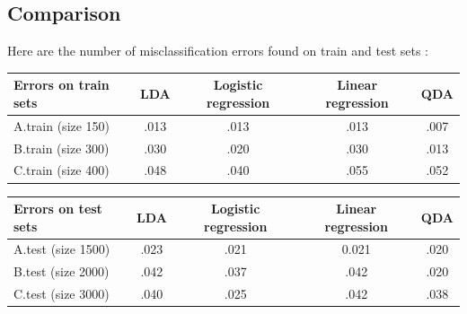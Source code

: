 \documentclass[11pt,a4paper]{article}
\begin{document}
\subsection{Comparison}
%
\hspace*{-6mm}Here are the number of misclassification errors found on train and test sets :
\\[5mm]
\begin{tabular}{|l|c|c|c|c|}
  \hline
  Errors on train sets & LDA & Logistic regression & Linear regression & QDA \\
  \hline
  A.train (size 150) & .013 & .013 & .013 & .007 \\
  B.train (size 300) & .030 & .020 & .030 & .013 \\
  C.train (size 400) & .048 & .040 & .055 & .052 \\
  \hline
\end{tabular}
%
\begin{tabular}{|l|c|c|c|c|}
  \hline
  Errors on test sets & LDA & Logistic regression & Linear regression & QDA \\
  \hline
  A.test (size 1500) & .023 & .021 & 0.021 & .020 \\
  B.test (size 2000) & .042 & .037 & .042 & .020 \\
  C.test (size 3000) & .040 & .025 & .042 & .038 \\
  \hline
\end{tabular}
\end{document}
